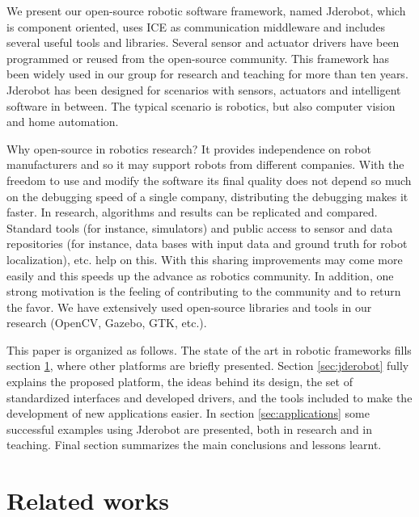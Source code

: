 \documentclass[twocolumn]{svjour3}          %
\begin{document}

We present our open-source robotic software framework, named Jderobot, which is component oriented, uses ICE as communication middleware and includes several useful tools and libraries. Several sensor and actuator drivers have been programmed or reused from the open-source community. This framework has been widely used in our group for research and teaching for more than ten years. Jderobot has been designed for scenarios with sensors, actuators and intelligent software in between. The typical scenario is robotics, but also computer vision and home automation.

Why open-source in robotics research? It provides independence on robot manufacturers and so it may support robots from different companies. With the freedom to use and modify the software its final quality does not depend so much on the debugging speed of a single company, distributing the debugging makes it faster. In research, algorithms and results can be replicated and compared. Standard tools (for instance, simulators) and public access to sensor and data repositories (for instance, data bases with input data and ground truth for robot localization), etc. help on this. With this sharing improvements may come more easily and this speeds up the advance as robotics community. In addition, one strong motivation is the feeling of contributing to the community and to return the favor. We have extensively used open-source libraries and tools in our research (OpenCV, Gazebo, GTK, etc.). 

This paper is organized as follows. The state of the art in robotic frameworks fills section \ref{sec:relatedworks}, where other platforms are briefly presented. Section \ref{sec:jderobot} fully explains the proposed platform, the ideas behind its design, the set of standardized interfaces and developed drivers, and the tools included to make the development of new applications easier. In section \ref{sec:applications} some successful examples using Jderobot are presented, both in research and in teaching. Final section summarizes the main conclusions and lessons learnt.

\section{Related works}
\label{sec:relatedworks}
\end{document}

